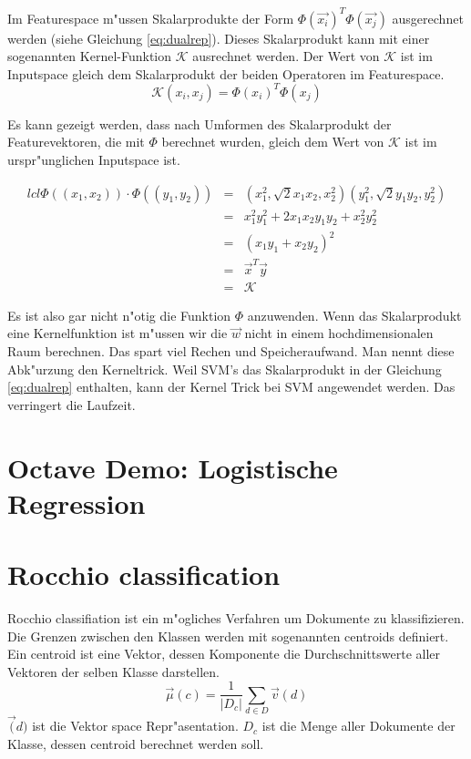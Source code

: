 \documentclass[12pt,a4paper,twoside]{article}
\begin{document}
Im Featurespace m"ussen Skalarprodukte der Form $\Phi(\vec{x_i})^T \Phi(\vec{x_j})$ ausgerechnet werden (siehe Gleichung \ref{eq:dualrep}). Dieses Skalarprodukt kann mit einer sogenannten Kernel-Funktion $\mathcal{K}$ ausrechnet werden. Der Wert von $\mathcal{K}$ ist im Inputspace gleich dem Skalarprodukt der beiden Operatoren im Featurespace.
\begin{equation}
  \label{eq:kerneltrick}
  \mathcal{K}(x_i, x_j) = \Phi(x_i)^T \Phi(x_j)
\end{equation}

Es kann gezeigt werden, dass nach Umformen des Skalarprodukt der Featurevektoren, die mit $\Phi$ berechnet wurden, gleich dem Wert von $\mathcal{K}$ ist im urspr"unglichen Inputspace ist.

\begin{eqnarray}{lcl}
  \label{eq:transformkernel}
  \Phi((x_1, x_2)) \cdot \Phi((y_1, y_2)) & = & (x_1^2, \sqrt{2} x_1 x_2, x_2^2)(y_1^2, \sqrt{2} y_1 y_2, y_2^2)\\
& = & x_1^2 y_1^2 + 2 x_1 x_2 y_1 y_2 + x_2^2 y_2^2 \\
& = & (x_1 y_1 + x_2 y_2)^2 \\
& = & \vec{x}^T \vec{y} \\
& = & \mathcal{K}
\end{eqnarray}

Es ist also gar nicht n"otig die Funktion $\Phi$ anzuwenden. Wenn das Skalarprodukt eine Kernelfunktion ist m"ussen wir die $\vec{w}$ nicht in einem hochdimensionalen Raum berechnen. Das spart viel Rechen und Speicheraufwand. Man nennt diese Abk"urzung den Kerneltrick. Weil SVM's das Skalarprodukt in der Gleichung \ref{eq:dualrep} enthalten, kann der Kernel Trick bei SVM angewendet werden. Das verringert die Laufzeit.

\appendix

\section{Octave Demo: Logistische Regression}
\label{sec:code}


\section{Rocchio classification}
\label{sec:rocchio}

Rocchio classifiation ist ein m"ogliches Verfahren um Dokumente zu klassifizieren. Die Grenzen zwischen den Klassen werden mit sogenannten centroids definiert. Ein centroid ist eine Vektor, dessen Komponente die Durchschnitts\-werte aller Vektoren der selben Klasse darstellen.
\[
\vec \mu(c) = \frac{1}{|D_c|} \sum_{d \in D} \vec v (d)
\]
$\vec (d)$ ist die Vektor space Repr"asentation. $D_c$ ist die Menge aller Dokumente der Klasse, dessen centroid berechnet werden soll.
\end{document}
